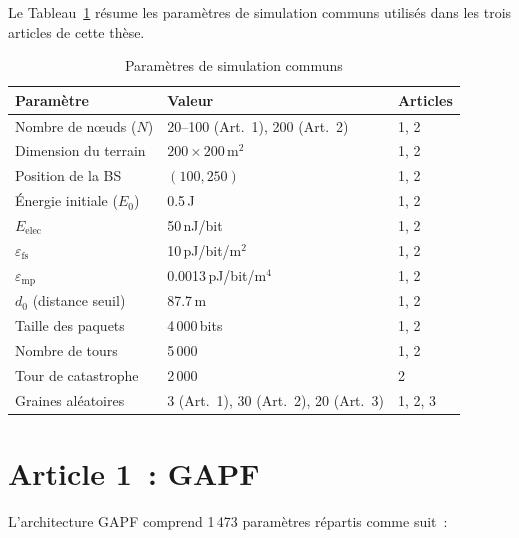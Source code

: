 \label{ann:params}

Le Tableau~\ref{tab:common-params} résume les paramètres de simulation communs utilisés dans les trois articles de cette thèse.

\begin{table}[htb]
\centering
\caption{Paramètres de simulation communs}
\label{tab:common-params}
\begin{tabular}{lll}
\toprule
\textbf{Paramètre} & \textbf{Valeur} & \textbf{Articles} \\
\midrule
Nombre de n\oe{}uds ($N$) & 20--100 (Art.~1), 200 (Art.~2) & 1, 2 \\
Dimension du terrain & $200 \times 200$\,m$^2$ & 1, 2 \\
Position de la BS & $(100, 250)$ & 1, 2 \\
Énergie initiale ($E_0$) & 0.5\,J & 1, 2 \\
$E_{\text{elec}}$ & 50\,nJ/bit & 1, 2 \\
$\varepsilon_{\text{fs}}$ & 10\,pJ/bit/m$^2$ & 1, 2 \\
$\varepsilon_{\text{mp}}$ & 0.0013\,pJ/bit/m$^4$ & 1, 2 \\
$d_0$ (distance seuil) & 87.7\,m & 1, 2 \\
Taille des paquets & 4\,000\,bits & 1, 2 \\
Nombre de tours & 5\,000 & 1, 2 \\
Tour de catastrophe & 2\,000 & 2 \\
Graines aléatoires & 3 (Art.~1), 30 (Art.~2), 20 (Art.~3) & 1, 2, 3 \\
\bottomrule
\end{tabular}
\end{table}


\label{ann:architectures}

\section*{Article 1~: GAPF}

L'architecture GAPF comprend 1\,473 paramètres répartis comme suit~:

